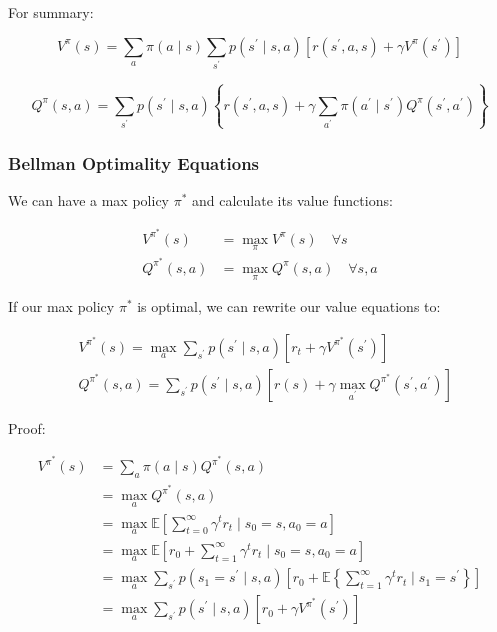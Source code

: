 \documentclass[11pt]{article}
\begin{document}
For summary:

\begin{equation}
V^{\pi}(s) =\sum_{a} \pi(a \mid s) \sum_{s^{\prime}} p\left(s^{\prime} \mid s, a\right)\left[r\left(s^{\prime}, a, s\right)+\gamma V^{\pi}\left(s^{\prime}\right)\right]
\end{equation}

\begin{equation}
Q^{\pi}(s, a) =\sum_{s^{\prime}} p\left(s^{\prime} \mid s, a\right)\left\{r\left(s^{\prime}, a, s\right)+\gamma\sum_{a^{\prime}} \pi\left(a^{\prime} \mid s^{\prime}\right) Q^{\pi}\left(s^{\prime}, a^{\prime}\right)\right\}
\end{equation}


\subsubsection{Bellman Optimality Equations}

We can have a max policy $\pi^*$ and calculate its value functions:

\begin{equation}
\begin{array}{rlr}
V^{\pi^{*}}(s) & =\max _{\pi} V^{\pi}(s) \quad \forall s \\
Q^{\pi^{*}}(s, a) & =\max _{\pi} Q^{\pi}(s, a) \quad \forall s, a
\end{array}
\end{equation}

If our max policy $\pi^*$ is optimal, we can rewrite our value equations to:

\begin{equation}
\begin{aligned}
&V^{\pi^{*}}(s)=\max _{a} \sum_{s^{\prime}} p\left(s^{\prime} \mid s, a\right)\left[r_{t}+\gamma V^{\pi^{*}}\left(s^{\prime}\right)\right] \\
&Q^{\pi^{*}}(s, a)=\sum_{s^{\prime}} p\left(s^{\prime} \mid s, a\right)\left[r(s)+\gamma \max _{a^{\prime}} Q^{\pi^{*}}\left(s^{\prime}, a^{\prime}\right)\right]
\end{aligned}
\end{equation}


Proof: 

\begin{align*}
V^{\pi^{*}}(s) &=\sum_{a} \pi(a \mid s) Q^{\pi^{*}}(s, a) \\
&=\max _{a} Q^{\pi^{*}}(s, a) \\
&=\max _{a} \mathbb{E}\left[\sum_{t=0}^{\infty} \gamma^{t} r_{t} \mid s_{0}=s, a_{0}=a\right] \\
&=\max _{a} \mathbb{E}\left[r_{0}+\sum_{t=1}^{\infty} \gamma^{t} r_{t} \mid s_{0}=s, a_{0}=a\right] \\
&=\max _{a} \sum_{s^{\prime}} p\left(s_{1}=s^{\prime} \mid s, a\right)\left[r_{0}+\mathbb{E}\left\{\sum_{t=1}^{\infty} \gamma^{t} r_{t} \mid s_{1}=s^{\prime}\right\}\right] \\
&= \max _{a} \sum_{s^{\prime}} p\left(s^{\prime} \mid s, a\right)\left[r_{0}+\gamma V^{\pi^{*}}\left(s^{\prime}\right)\right] \\
\end{align*}
\end{document}
